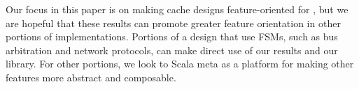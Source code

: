 \documentclass[conference]{IEEEtran}
\begin{document}
Our focus in this paper is on making cache designs feature-oriented for \Riscv{}, but we are hopeful that these results can promote greater feature orientation in other portions of \Riscv{} implementations.  Portions of a design that use FSMs, such as bus arbitration and network protocols, can make direct use of our results and our library.  For other portions, we look to Scala meta as a platform for making other \Riscv{} features more abstract and composable.





\clearpage

\end{document}
